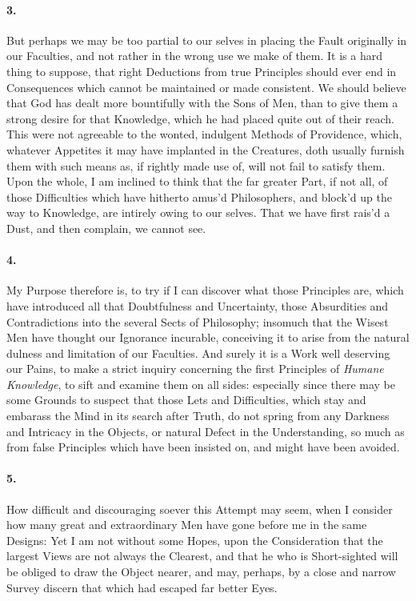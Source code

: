 \documentclass[]{article}
\newenvironment{sectionbody}{\begin{multicols}{2}}{\end{multicols}}
\begin{document}
\begin{sectionbody}
\paragraph{3.} But perhaps we may be too partial to our selves in placing the
Fault originally in our Faculties, and not rather in the wrong
use we make of them.  It is a hard thing to suppose, that right
Deductions from true Principles should ever end in Consequences
which cannot be maintained or made consistent.  We should believe
that God has dealt more bountifully with the Sons of Men, than to
give them a strong desire for that Knowledge, which he had placed
quite out of their reach.  This were not agreeable to the wonted,
indulgent Methods of Providence, which, whatever Appetites it may
have implanted in the Creatures, doth usually furnish them with
such means as, if rightly made use of, will not fail to satisfy
them.  Upon the whole, I am inclined to think that the far
greater Part, if not all, of those Difficulties which have
hitherto amus'd Philosophers, and block'd up the way to
Knowledge, are intirely owing to our selves.  That we have first
rais'd a Dust, and then complain, we cannot see.



\paragraph{4.} My Purpose therefore is, to try if I can discover what those
Principles are, which have introduced all that Doubtfulness and
Uncertainty, those Absurdities and Contradictions into the
several Sects of Philosophy; insomuch that the Wisest Men have
thought our Ignorance incurable, conceiving it to arise from the
natural dulness and limitation of our Faculties.  And surely it
is a Work well deserving our Pains, to make a strict inquiry
concerning the first Principles of \emph{Humane Knowledge}, to
sift and examine them on all sides: especially since there may be
some Grounds to suspect that those Lets and Difficulties, which
stay and embarass the Mind in its search after Truth, do not
spring from any Darkness and Intricacy in the Objects, or natural
Defect in the Understanding, so much as from false Principles
which have been insisted on, and might have been avoided.



\paragraph{5.} How difficult and discouraging soever this Attempt may seem, when
I consider how many great and extraordinary Men have gone before
me in the same Designs: Yet I am not without some Hopes, upon the
Consideration that the largest Views are not always the Clearest,
and that he who is Short-sighted will be obliged to draw the
Object nearer, and may, perhaps, by a close and narrow Survey
discern that which had escaped far better Eyes.




\end{sectionbody}
\end{document}
